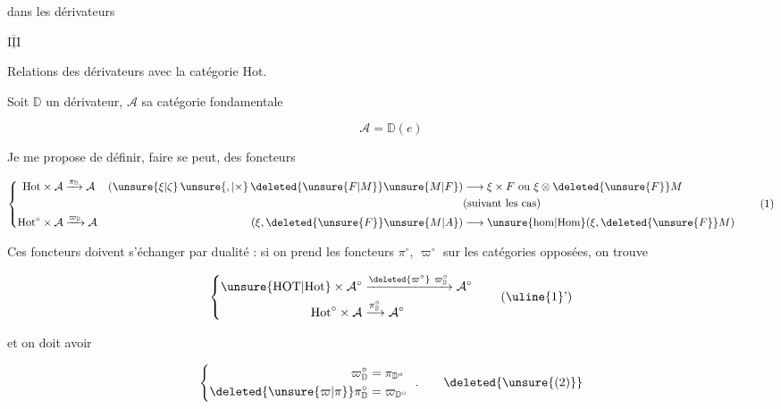 
  dans les dérivateurs

$\overline{\underline{\mathrm{III}}}$


Relations des dérivateurs avec la catégorie Hot.

Soit $\mathbb D$ un dérivateur, $\mathcal A$ sa catégorie fondamentale

\[\mathcal A=\mathbb D(e)\]

Je me propose de définir,   faire se peut, des foncteurs

\[
\left\{\begin{aligned}
\mathrm{Hot}\times\mathcal A&\xrightarrow{\pi_{\mathbb D}}\mathcal A
&(\unsure{\xi|\zeta}\,\unsure{,|\times}\,\deleted{\unsure{F|M}}\unsure{M|F})&\longrightarrow\xi\times F\ \text{ou }\xi\otimes\deleted{\unsure{F}}M\\
&&&\text{(suivant les cas)}\\
\mathrm{Hot}^{\circ}\times\mathcal A&\xrightarrow{\varpi_{\mathbb D}}\mathcal A
&(\xi,\deleted{\unsure{F}}\unsure{M|A})&\longrightarrow
\unsure{\mathrm{hom}|\mathrm{Hom}}(\xi,\deleted{\unsure{F}}M)
\end{aligned}\right.\tag*{(1)}
\]

Ces foncteurs doivent s'échanger par dualité : si on prend les foncteurs $\pi^\circ$, $\varpi^\circ$ sur les catégories opposées, on trouve

\[
\left\{\begin{aligned}
\unsure{\mathrm{HOT}|\mathrm{Hot}}\times\mathcal A^\circ&\xrightarrow{\deleted{\varpi^\circ}\ \varpi_{\mathbb D}^{\circ}}\mathcal A^\circ\\
\mathrm{Hot}^{\circ}\times\mathcal A&\xrightarrow{\pi_{\mathbb D}^{\circ}}\mathcal A^\circ
\end{aligned}\right.\tag*{(\uline{1}')}
\]

et on doit avoir

\[
\left\{\begin{aligned}
\varpi_{\mathbb D}^\circ&=\pi_{\mathbb D^\circ}\\
\deleted{\unsure{\varpi|\pi}}\pi_{\mathbb D}^\circ&=\varpi_{\mathbb D^\circ}
\end{aligned}\right.\ .\tag*{\deleted{\unsure{(2)}}}
\]

